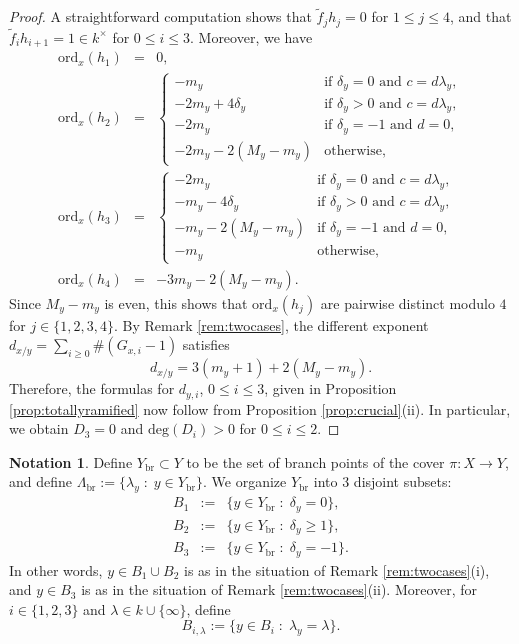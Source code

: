 \documentclass{amsart}
\numberwithin{equation}{section}
\numberwithin{table}{section}
\theoremstyle{plain}
\theoremstyle{definition}
\newtheorem{nota}[theorem]{Notation}
\theoremstyle{remark}
\begin{document}
\begin{proof}
A straightforward computation shows that $\widetilde{f}_j h_j=0$ for $1\le j\le 4$, and that
$\widetilde{f}_i h_{i+1}=1\in k^\times$ for $0\le i\le 3$. Moreover, we have
\begin{eqnarray*}
\mathrm{ord}_x(h_1) &=& 0,\\
\mathrm{ord}_x(h_2) &=&\left\{ 
\begin{array}{ll} 
-m_y &\mbox{if } \delta_y=0 \mbox{ and } c=d\lambda_y,\\
- 2m_y + 4\delta_y  &\mbox{if } \delta_y>0 \mbox{ and } c=d\lambda_y,\\
-2m_y&\mbox{if } \delta_y=-1 \mbox{ and }d=0,\\
-2m_y - 2 (M_y-m_y)&\mbox{otherwise},
\end{array}\right.\\[2ex]
\mathrm{ord}_x(h_3)&=&\left\{ 
\begin{array}{ll} 
-2m_y  &\mbox{if } \delta_y=0 \mbox{ and } c=d\lambda_y,\\
- m_y - 4\delta_y  &\mbox{if } \delta_y>0 \mbox{ and } c=d\lambda_y,\\
- m_y - 2 (M_y-m_y) &\mbox{if } \delta_y=-1 \mbox{ and }d=0,\\
- m_y& \mbox{otherwise},
\end{array}\right.\\
\mathrm{ord}_x(h_4) &=& -3m_y-2(M_y-m_y).
\end{eqnarray*}
Since $M_y-m_y$ is even, this shows that $\mathrm{ord}_x(h_j)$ are pairwise distinct modulo $4$ for $j\in\{1,2,3,4\}$. By Remark \ref{rem:twocases}, the different exponent $d_{x/y} = \sum_{i\ge 0} \#(G_{x,i}-1)$ satisfies
$$d_{x/y} = 3(m_y+1) + 2 (M_y-m_y).$$
Therefore, the formulas for $d_{y,i}$, $0\le i\le 3$, given in Proposition \ref{prop:totallyramified} now follow from Proposition \ref{prop:crucial}(ii). In particular, we obtain $D_3=0$ and $\mathrm{deg}(D_i)>0$ for $0\le i\le 2.$
\end{proof}

\begin{nota}
\label{not:branchpoints}
Define $Y_{\mathrm{br}}\subset Y$ to be the set of branch points of the cover $\pi:X\to Y$, and define $\Lambda_{\mathrm{br}}:=\{\lambda_y\;:\;y\in Y_{\mathrm{br}}\}$. We organize $Y_{\mathrm{br}}$  into 3 disjoint subsets:
\begin{eqnarray*}
B_1 &:=& \{ y\in Y_{\mathrm{br}} \; : \; \delta_y=0\},\\
B_2 &:=& \{ y\in Y_{\mathrm{br}} \; : \; \delta_y \ge 1\},\\
B_3 &:=& \{ y\in Y_{\mathrm{br}} \; : \; \delta_y=-1\}.
\end{eqnarray*}
In other words, $y\in B_1\cup B_2$ is as in the situation of Remark \ref{rem:twocases}(i), and $y\in B_3$ is as in the situation of Remark \ref{rem:twocases}(ii).
Moreover, for $i\in\{1,2,3\}$ and $\lambda\in k\cup\{\infty\}$, define
$$B_{i,\lambda} := \{ y\in B_i \;:\; \lambda_y=\lambda\}.$$
\end{nota}
\end{document}
